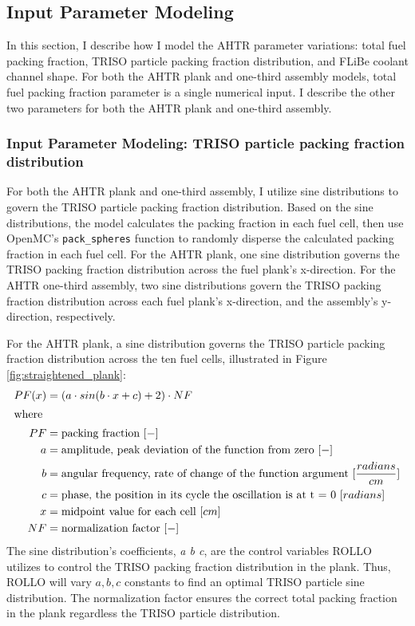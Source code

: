 \subsection{Input Parameter Modeling}
\label{sec:input-parameter-modeling}
In this section, I describe how I model the \gls{AHTR} parameter variations: total fuel packing 
fraction, \gls{TRISO} particle packing fraction distribution, and \gls{FLiBe} coolant channel shape. 
For both the \gls{AHTR} plank and one-third assembly models, total fuel packing fraction parameter 
is a single numerical input.
I describe the other two parameters for both the \gls{AHTR} plank and one-third assembly. 

\subsubsection{Input Parameter Modeling: TRISO particle packing fraction distribution}
For both the \gls{AHTR} plank and one-third assembly, I utilize sine distributions to govern the 
\gls{TRISO} particle packing fraction distribution. 
Based on the sine distributions, the model calculates the packing fraction in each fuel cell, then use 
OpenMC's \texttt{pack\_spheres} function to randomly disperse the calculated packing fraction in each 
fuel cell. 
For the \gls{AHTR} plank, one sine distribution governs the \gls{TRISO} packing fraction distribution 
across the fuel plank's x-direction. 
For the \gls{AHTR} one-third assembly, two sine distributions govern the \gls{TRISO} packing fraction 
distribution across each fuel plank's x-direction, and the assembly's y-direction, respectively. 

For the \gls{AHTR} plank, a sine distribution governs the \gls{TRISO} particle packing fraction 
distribution across the ten fuel cells, illustrated in Figure \ref{fig:straightened_plank}:
\begin{align}
    PF(x) &= \left(a\cdot sin(b\cdot x + c) + 2\right) \cdot NF\\
    \intertext{where}
    PF &= \mbox{packing fraction } [-] \nonumber \\ 
    a &= \mbox{amplitude, peak deviation of the function from zero } [-] \nonumber \\
    b &= \mbox{angular frequency, rate of change of the function argument } [\frac{radians}{cm}] \nonumber \\
    c &= \mbox{phase, the position in its cycle the oscillation is at t = 0 } [radians]\nonumber \\
    x &= \mbox{midpoint value for each cell } [cm]\nonumber \\
    NF &= \mbox{normalization factor } [-]\nonumber
\end{align}
The sine distribution's coefficients, \textit{a b c}, are the control variables \gls{ROLLO} 
utilizes to control the TRISO packing fraction distribution in the plank.
Thus, \gls{ROLLO} will vary $a, b, c$ constants to find an optimal TRISO particle 
sine distribution. 
The normalization factor ensures the correct total packing fraction 
in the plank regardless the \gls{TRISO} particle distribution.

